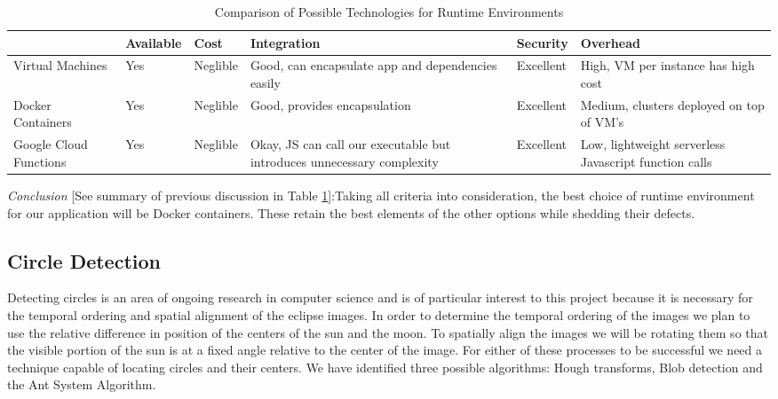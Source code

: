\documentclass[10pt, onecolumn, draftclsnofoot, letterpaper, compsoc]{IEEEtran}
\begin{document}
\begin{table}[h]
\centering
\caption{Comparison of Possible Technologies for Runtime Environments}
\begin{tabular}{|p{2.1cm}|p{2.1cm}|p{2.1cm}|p{2.1cm}|p{2.1cm}|p{2.1cm}|}
\cline{4-4}

\hline  & Available & Cost & Integration & Security & Overhead \\ \hline

Virtual Machines & Yes & Neglible & Good, can encapsulate app and dependencies
easily &  Excellent & High, VM per instance has high cost  \\ \hline

Docker Containers  & Yes & Neglible & Good, provides encapsulation &  Excellent
& Medium, clusters deployed on top of VM’s  \\ \hline

Google Cloud Functions  & Yes & Neglible & Okay, JS can call our executable but
introduces unnecessary complexity & Excellent & Low, lightweight serverless
Javascript function calls  \\ \hline

\end{tabular}
\label{table:george2}
\end{table}

\textit{Conclusion} [See summary of previous discussion in Table
\ref{table:george2}]:Taking all criteria into consideration, the best choice of runtime environment
for our application will be Docker containers. These retain the best elements of
the other options while shedding their defects. \\

\subsection{Circle Detection}

Detecting circles is an area of ongoing research in computer science and is of
particular interest to this project because it is necessary for the temporal
ordering and spatial alignment of the eclipse images. In order to determine the
temporal ordering of the images we plan to use the relative difference in
position of the centers of the sun and the moon. To spatially align the images
we will be rotating them so that the visible portion of the sun is at a fixed
angle relative to the center of the image. For either of these processes to be
successful we need a technique capable of locating circles and their centers. We
have identified three possible algorithms: Hough transforms, Blob detection and
the Ant System Algorithm. \\
\end{document}
